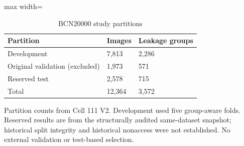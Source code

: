 \begin{table}[t]
\centering
\small
\caption{BCN20000 study partitions}
\label{tab:01-dataset-partitions}
\begin{adjustbox}{max width=\textwidth}
\begin{tabular}{lll}
\toprule
\textbf{Partition} & \textbf{Images} & \textbf{Leakage groups} \\
\midrule
Development & 7,813 & 2,286 \\
Original validation (excluded) & 1,973 & 571 \\
Reserved test & 2,578 & 715 \\
Total & 12,364 & 3,572 \\
\bottomrule
\end{tabular}
\end{adjustbox}
\par\smallskip
\begin{minipage}{\textwidth}\footnotesize Partition counts from Cell 111 V2. Development used five group-aware folds. Reserved results are from the structurally audited same-dataset snapshot; historical split integrity and historical nonaccess were not established. No external validation or test-based selection.\end{minipage}
\end{table}
